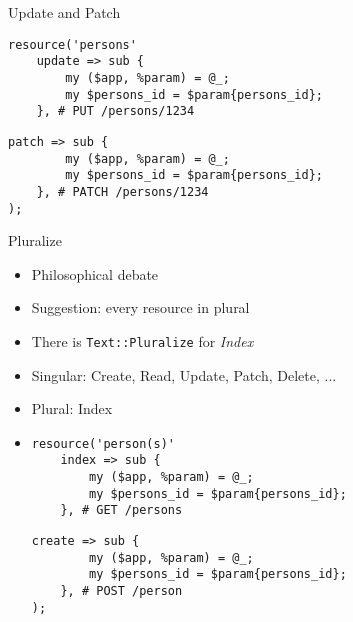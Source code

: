 
\begin{frame}[fragile]{Update and Patch}
\pause
\begin{lstlisting}
resource('persons'
    update => sub {
        my ($app, %param) = @_;
        my $persons_id = $param{persons_id};
    }, # PUT /persons/1234
\end{lstlisting}\pause\begin{lstlisting}[firstnumber=last]
    patch => sub {
        my ($app, %param) = @_;
        my $persons_id = $param{persons_id};
    }, # PATCH /persons/1234
);
\end{lstlisting}
\end{frame}


\begin{frame}[fragile]{Pluralize}
\pause
\begin{itemize}
    \item Philosophical debate
    \pause
    \item Suggestion: every resource in plural
    \pause
    \item There is \texttt{Text::Pluralize} for \textit{Index}
    \pause
    \item Singular: Create, Read, Update, Patch, Delete, ...
    \pause
    \item Plural: Index
    \pause
    \item[]
\begin{lstlisting}
resource('person(s)'
    index => sub {
        my ($app, %param) = @_;
        my $persons_id = $param{persons_id};
    }, # GET /persons
\end{lstlisting}\pause\begin{lstlisting}[firstnumber=last]
    create => sub {
        my ($app, %param) = @_;
        my $persons_id = $param{persons_id};
    }, # POST /person
);
\end{lstlisting}
\end{itemize}
\end{frame}


